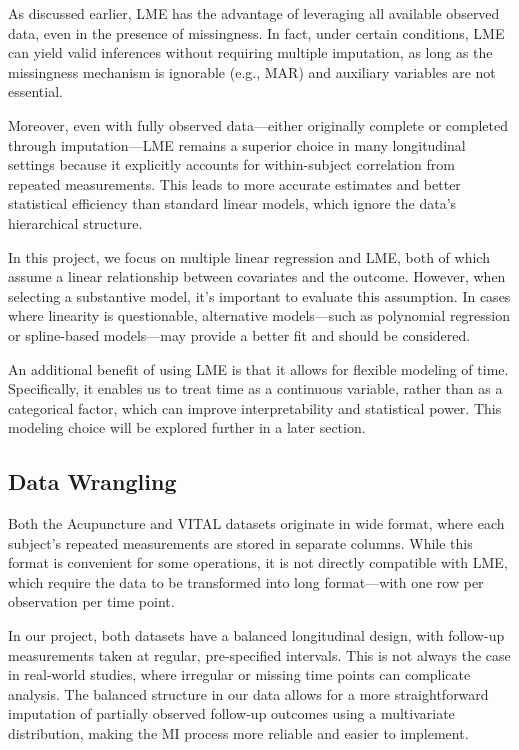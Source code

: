 \documentclass{article}
\begin{document}
As discussed earlier, LME has the advantage of leveraging all available
observed data, even in the presence of missingness. In fact, under
certain conditions, LME can yield valid inferences without requiring
multiple imputation, as long as the missingness mechanism is ignorable
(e.g., MAR) and auxiliary variables are not essential.

Moreover, even with fully observed data---either originally complete or
completed through imputation---LME remains a superior choice in many
longitudinal settings because it explicitly accounts for within-subject
correlation from repeated measurements. This leads to more accurate
estimates and better statistical efficiency than standard linear models,
which ignore the data's hierarchical structure.

In this project, we focus on multiple linear regression and LME, both of
which assume a linear relationship between covariates and the outcome.
However, when selecting a substantive model, it's important to evaluate
this assumption. In cases where linearity is questionable, alternative
models---such as polynomial regression or spline-based models---may
provide a better fit and should be considered.

An additional benefit of using LME is that it allows for flexible
modeling of time. Specifically, it enables us to treat time as a
continuous variable, rather than as a categorical factor, which can
improve interpretability and statistical power. This modeling choice
will be explored further in a later section.

\subsection{Data Wrangling}\label{data-wrangling}

Both the Acupuncture and VITAL datasets originate in wide format, where
each subject's repeated measurements are stored in separate columns.
While this format is convenient for some operations, it is not directly
compatible with LME, which require the data to be transformed into long
format---with one row per observation per time point.

In our project, both datasets have a balanced longitudinal design, with
follow-up measurements taken at regular, pre-specified intervals. This
is not always the case in real-world studies, where irregular or missing
time points can complicate analysis. The balanced structure in our data
allows for a more straightforward imputation of partially observed
follow-up outcomes using a multivariate distribution, making the MI
process more reliable and easier to implement.
\end{document}
